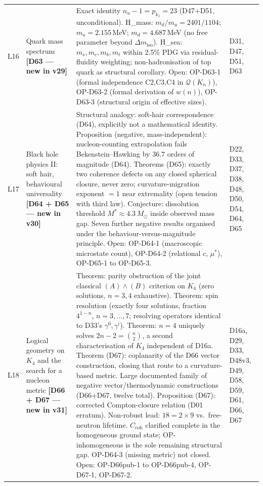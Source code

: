 \documentclass[11pt,a4paper]{article}
\theoremstyle{plain}
\theoremstyle{definition}
\theoremstyle{remark}
\newcommand{\Ccoh}{C_{\mathrm{coh}}}
\begin{document}
\begin{longtable}{L{0.6cm}L{3.0cm}L{5.5cm}L{4.0cm}}
L16 & Quark mass spectrum \textbf{[D63 --- new in v29]} & Exact identity $n_u - 1 = p_{k_1} = 23$ (D47+D51, \textcolor{proofblue}{unconditional}). \textcolor{conjecturegreen}{H\_mass}: $m_d/m_u = 2401/1104$; $m_u = 2.155$\,MeV; $m_d = 4.687$\,MeV (no free parameter beyond $\Delta m_{\mathrm{iso}}$). \textcolor{conjecturegreen}{H\_sea}: $m_s, m_c, m_b, m_t$ within 2.5\% PDG via residual-fluidity weighting; non-hadronisation of top quark as structural corollary. Open: OP-D63-1 (formal independence C2,C3,C4 in $\mathcal{Q}(K_n)$), OP-D63-2 (formal derivation of $w(n)$), OP-D63-3 (structural origin of effective sizes). & D31, D47, D51, D63\\[0.3em]
L17 & Black hole physics II: soft hair, behavioural universality \textbf{[D64 + D65 --- new in v30]} & \textcolor{conjecturegreen}{Structural analogy}: soft-hair correspondence (D64), explicitly not a mathematical identity. \textcolor{proofblue}{Proposition} (negative, mass-independent): nucleon-counting extrapolation fails Bekenstein--Hawking by $36.7$ orders of magnitude (D64). \textcolor{proofblue}{Theorems} (D65): exactly two coherence defects on any closed spherical closure, never zero; curvature-migration exponent $=1$ near extremality (open tension with third law). \textcolor{conjecturegreen}{Conjecture}: dissolution threshold $M^*\approx4.3\,M_\odot$ inside observed mass gap. Seven further negative results organised under the behaviour-versus-magnitude principle. Open: OP-D64-1 (macroscopic microstate count), OP-D64-2 (relational $c$, $\mu^*$), OP-D65-1 to OP-D65-3. & D22, D33, D37, D38, D48, D50, D54, D64, D65\\[0.3em]
L18 & Logical geometry on $K_4$ and the search for a nucleon metric \textbf{[D66 + D67 --- new in v31]} & \textcolor{proofblue}{Theorem}: parity obstruction of the joint classical $(A)\wedge(B)$ criterion on $K_4$ (zero solutions, $n=3,4$ exhaustive). \textcolor{proofblue}{Theorem}: spin resolution (exactly four solutions, fraction $4^{1-n}$, $n=3,\ldots,7$; resolving operators identical to D33's $\gamma^0,\gamma^i$). \textcolor{proofblue}{Theorem}: $n=4$ uniquely solves $2n-2=\binom{n}{2}$, a second characterisation of $K_4$ independent of D16a. \textcolor{proofblue}{Theorem} (D67): coplanarity of the D66 vector construction, closing that route to a curvature-based metric. Large documented family of negative vector/thermodynamic constructions (D66+D67, twelve total). \textcolor{proofblue}{Proposition} (D67): corrected Compton-closure relation (D01 erratum). Non-robust lead: $18=2\times9$ vs.\ free-neutron lifetime. $\Ccoh$ clarified complete in the homogeneous ground state; OP-inhomogeneous is the sole remaining structural gap. OP-D64-3 (missing metric) not closed. Open: OP-D66pub-1 to OP-D66pub-4, OP-D67-1, OP-D67-2. & D16a, D29, D33, D48v3, D49, D58, D59, D61, D66, D67\\[0.3em]

\end{longtable}
\end{document}
